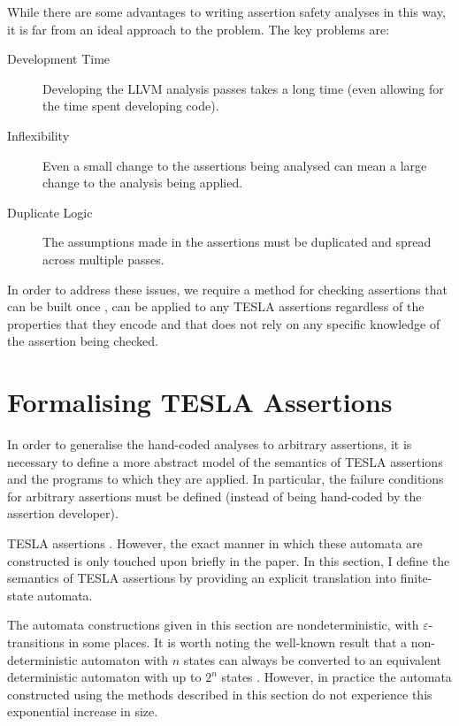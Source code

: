 While there are some advantages to writing assertion safety analyses in
this way, it is far from an ideal approach to the problem. The key
problems are:
\begin{description}
  \item[Development Time] Developing the LLVM analysis passes takes a
    long time (even allowing for the time spent developing
     code).
  \item[Inflexibility] Even a small change to the assertions being
    analysed can mean a large change to the analysis being applied.
  \item[Duplicate Logic] The assumptions made in the assertions must be
    duplicated and spread across multiple passes.
\end{description}

In order to address these issues, we require a method for checking
assertions that can be built once , can be applied
to any TESLA assertions regardless of the properties that they encode
and that does not rely on any specific knowledge of the assertion being
checked.

\section{Formalising TESLA Assertions} \label{sec:formal}

In order to generalise the hand-coded analyses to arbitrary assertions,
it is necessary to define a more abstract model of the semantics of
TESLA assertions and the programs to which they are applied. In
particular, the failure conditions for arbitrary assertions must be
defined (instead of being hand-coded by the assertion developer).

TESLA assertions . However, the exact manner in which these automata are constructed is
only touched upon briefly in the paper. In this section, I define the
semantics of TESLA assertions by providing an explicit translation into
finite-state automata.

The automata constructions given in this section are nondeterministic, with
$\varepsilon$-transitions in some places. It is worth noting the well-known
result that a non-deterministic automaton with $n$ states can always be
converted to an equivalent deterministic automaton with up to $2^n$ states
\cite{rabin_finite_1959}. However, in practice the automata constructed using
the methods described in this section do not experience this exponential
increase in size.

